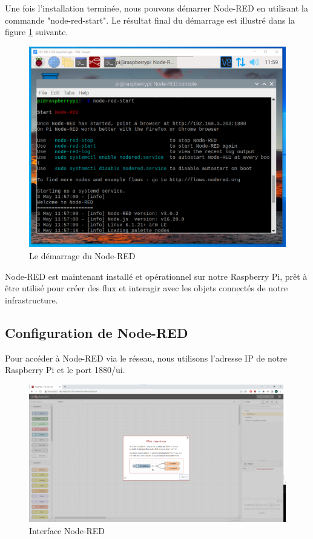 Une fois l'installation terminée, nous pouvons démarrer Node-RED en utilisant la commande "node-red-start". Le résultat final du démarrage est illustré dans la figure \ref{Chap4.3.5} suivante.

\begin{figure}[H]
 \centering
    \includegraphics[width=15cm]{Images/NodeRedStart1.png}
    \caption{Le démarrage du Node-RED}
    \label{Chap4.3.5}
\end{figure}    

Node-RED est maintenant installé et opérationnel sur notre Raspberry Pi, prêt à être utilisé pour créer des flux et interagir avec les objets connectés de notre infrastructure.


\subsection{Configuration de Node-RED}

Pour accéder à Node-RED via le réseau, nous utilisons l'adresse IP de notre Raspberry Pi et le port 1880/ui.

\begin{figure}[H]
\centering
\includegraphics[width=15cm]{Images/NodeRedInterface.png}
\caption{Interface Node-RED}
\label{Chap4.3.6}
\end{figure}

